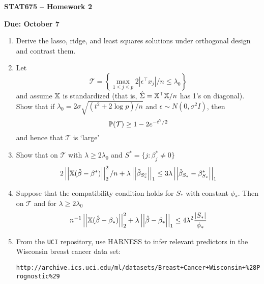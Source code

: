 \documentclass[11pt]{article}
\begin{document}
\baselineskip=13.2pt
\parindent=0pt
\parskip=13.2pt
\pagestyle{empty}

\newcommand{\sd}{\textrm{sd}}

\centerline{\bf \Large STAT675 -- Homework 2}
\centerline{\bf \large Due: October 7} 
\begin{enumerate}
\item  Derive the lasso, ridge, and least squares solutions under orthogonal design and contrast them.
\item Let
\[
\mathcal{T} = \left\{ \max_{1 \leq j \leq p} 2|\epsilon^{\top} x_j|/n \leq \lambda_0\right\}
\]
and assume $\X$ is standardized (that is,
$\hat\Sigma = \X^{\top}\X/n$ has 1's on diagonal).  Show that
if $\lambda_0 = 2\sigma\sqrt{(t^2 + 2\log p)/n}$ and $\epsilon \sim N(0,\sigma^2 I)$, then
\[
\P(\mathcal{T}) \geq 1 - 2 e^{-t^2/2}
\]
and hence that $\mathcal{T}$ is `large'

\item
Show that on $\mathcal{T}$ with $\lambda \geq 2\lambda_0$ and $S^* = \{ j : \beta_j^* \neq 0\}$
\[
2\norm{\X(\hat\beta - \beta^*)}_2^2/n + \lambda \norm{\hat{\beta}_{S_*^c}}_1
\leq
3\lambda \norm{\hat{\beta}_{S_*} - \beta_{S_*}^*}_1
\]
\item
Suppose that the compatibility condition holds for $S_*$ with constant $\phi_*$.  Then on $\mathcal{T}$ and
for $\lambda \geq 2 \lambda_0$
\[
n^{-1}\norm{\X(\hat\beta - \beta_*)}_2^2 + \lambda \norm{\hat\beta - \beta_*}_1 \leq 4 \lambda^2 \frac{|S_*|}{\phi_*}
\]
\item From the {\tt UCI} repository, use HARNESS to infer relevant predictors in the Wisconsin breast cancer
data set: 

{\tt http://archive.ics.uci.edu/ml/datasets/Breast+Cancer+Wisconsin+\%28Prognostic\%29}
\end{enumerate}

\end{document}
